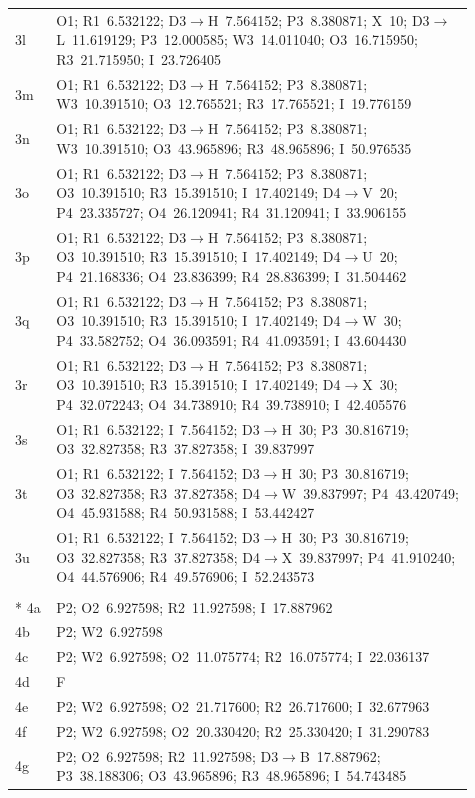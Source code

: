 \documentclass{swmcmthesis}
\begin{document}
\begin{longtable}{@{}l >{\raggedright\arraybackslash}p{0.91\linewidth}@{}}
    3l & O1; R1~6.532122; D3$\to$H~7.564152; P3~8.380871; X~10; D3$\to$L~11.619129; P3~12.000585; W3~14.011040; O3~16.715950; R3~21.715950; I~23.726405 \\
    3m & O1; R1~6.532122; D3$\to$H~7.564152; P3~8.380871; W3~10.391510; O3~12.765521; R3~17.765521; I~19.776159 \\
    3n & O1; R1~6.532122; D3$\to$H~7.564152; P3~8.380871; W3~10.391510; O3~43.965896; R3~48.965896; I~50.976535 \\
    3o & O1; R1~6.532122; D3$\to$H~7.564152; P3~8.380871; O3~10.391510; R3~15.391510; I~17.402149; D4$\to$V~20; P4~23.335727; O4~26.120941; R4~31.120941; I~33.906155 \\
    3p & O1; R1~6.532122; D3$\to$H~7.564152; P3~8.380871; O3~10.391510; R3~15.391510; I~17.402149; D4$\to$U~20; P4~21.168336; O4~23.836399; R4~28.836399; I~31.504462 \\
    3q & O1; R1~6.532122; D3$\to$H~7.564152; P3~8.380871; O3~10.391510; R3~15.391510; I~17.402149; D4$\to$W~30; P4~33.582752; O4~36.093591; R4~41.093591; I~43.604430 \\
    3r & O1; R1~6.532122; D3$\to$H~7.564152; P3~8.380871; O3~10.391510; R3~15.391510; I~17.402149; D4$\to$X~30; P4~32.072243; O4~34.738910; R4~39.738910; I~42.405576 \\
    3s & O1; R1~6.532122; I~7.564152; D3$\to$H~30; P3~30.816719; O3~32.827358; R3~37.827358; I~39.837997 \\
    3t & O1; R1~6.532122; I~7.564152; D3$\to$H~30; P3~30.816719; O3~32.827358; R3~37.827358; D4$\to$W~39.837997; P4~43.420749; O4~45.931588; R4~50.931588; I~53.442427 \\
    3u & O1; R1~6.532122; I~7.564152; D3$\to$H~30; P3~30.816719; O3~32.827358; R3~37.827358; D4$\to$X~39.837997; P4~41.910240; O4~44.576906; R4~49.576906; I~52.243573 \\
    \addlinespace
    \multicolumn{2}{@{}l}{\textbf{Vehicle $V_4$}} \\*
    4a & P2; O2~6.927598; R2~11.927598; I~17.887962 \\
    4b & P2; W2~6.927598 \\
    4c & P2; W2~6.927598; O2~11.075774; R2~16.075774; I~22.036137 \\
    4d & F \\
    4e & P2; W2~6.927598; O2~21.717600; R2~26.717600; I~32.677963 \\
    4f & P2; W2~6.927598; O2~20.330420; R2~25.330420; I~31.290783 \\
    4g & P2; O2~6.927598; R2~11.927598; D3$\to$B~17.887962; P3~38.188306; O3~43.965896; R3~48.965896; I~54.743485 \\

\end{longtable}
\end{document}
